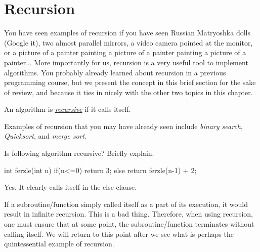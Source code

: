 \newpage
\section{Recursion}\label{sec:recursion}

You have seen examples of recursion if you have seen Russian Matryoshka dolls (Google it),
two almost parallel mirrors, a video camera pointed at the monitor, or a picture of a
painter painting a picture of a painter painting a picture of a painter...
More importantly for us, recursion is a very useful tool to implement algorithms.
You probably already learned about recursion in a previous programming course, but we 
present the concept in this brief section for the sake of review, and because it ties in
nicely with the other two topics in this chapter.

\begin{df}\label{df:rec}
An algorithm is \hyperref[df:rec]{\em recursive} if it calls itself.
\end{df}

Examples of recursion that you may have already seen include {\em binary search}, 
{\em Quicksort}, and {\em merge sort}.

\begin{ques}\label{ques:ferzlerec}
Is following algorithm recursive?
Briefly explain.
\begin{code}
	int ferzle(int n) {
	    if(n<=0) {
	        return 3;
	    } else {
	        return ferzle(n-1) + 2;
	    }
	}
\end{code}
\answerlinetwo
\begin{answer}
Yes.  It clearly calls itself in the else clause.
\end{answer}
\end{ques}

If a subroutine/function simply called itself as a part of its execution, 
it would result in infinite recursion.  This is a bad thing.
Therefore, when using recursion, one must ensure that at some point,
the subroutine/function terminates without calling itself.
We will return to this point after we see what is perhaps 
the quintessential example of recursion.

